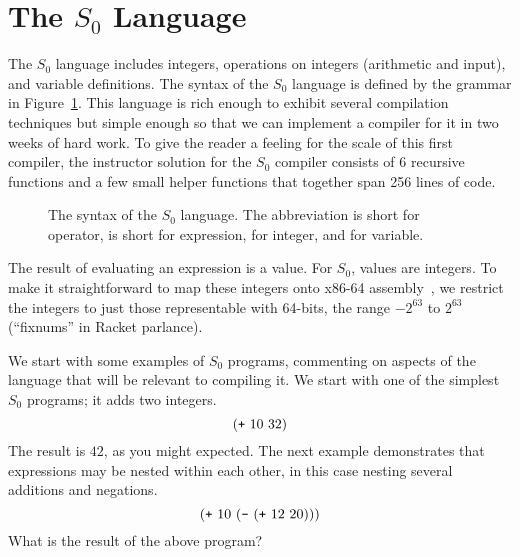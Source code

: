 \documentclass[12pt]{book}
\begin{document}
\section{The $S_0$ Language}
\label{sec:s0}

The $S_0$ language includes integers, operations on integers
(arithmetic and input), and variable definitions.  The syntax of the
$S_0$ language is defined by the grammar in
Figure~\ref{fig:s0-syntax}. This language is rich enough to exhibit
several compilation techniques but simple enough so that we can
implement a compiler for it in two weeks of hard work.  To give the
reader a feeling for the scale of this first compiler, the instructor
solution for the $S_0$ compiler consists of 6 recursive functions and
a few small helper functions that together span 256 lines of code.

\begin{figure}[btp]
\centering
{}
\caption{The syntax of the $S_0$ language. The abbreviation \Op{} is
  short for operator, \Exp{} is short for expression, \Int{} for integer,
  and \Var{} for variable.}
\label{fig:s0-syntax}
\end{figure}

The result of evaluating an expression is a value.  For $S_0$, values
are integers. To make it straightforward to map these integers onto
x86-64 assembly~\citep{Matz:2013aa}, we restrict the integers to just
those representable with 64-bits, the range $-2^{63}$ to $2^{63}$
(``fixnums'' in Racket parlance).

We start with some examples of $S_0$ programs, commenting on aspects
of the language that will be relevant to compiling it.  We start with
one of the simplest $S_0$ programs; it adds two integers.
\[
(\texttt{+}~10~32)
\]
The result is $42$, as you might expected. 
%
The next example demonstrates that expressions may be nested within
each other, in this case nesting several additions and negations.
\[
(\texttt{+}~10~ (\texttt{-}~ (\texttt{+}~12~20) ) )
\]
What is the result of the above program?
\end{document}

